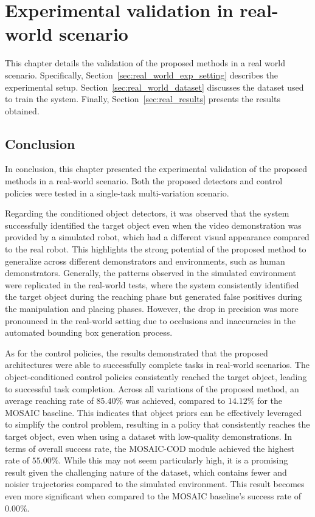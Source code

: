 \chapter{Experimental validation in real-world scenario}
\label{ch:real_world_application}
This chapter details the validation of the proposed methods in a real world scenario. Specifically, Section~\ref{sec:real_world_exp_setting} describes the experimental setup. Section~\ref{sec:real_world_dataset} discusses the dataset used to train the system. Finally, Section~\ref{sec:real_results} presents the results obtained.





\section{Conclusion}
In conclusion, this chapter presented the experimental validation of the proposed methods in a real-world scenario. Both the proposed detectors and control policies were tested in a single-task multi-variation scenario.

Regarding the conditioned object detectors, it was observed that the system successfully identified the target object even when the video demonstration was provided by a simulated robot, which had a different visual appearance compared to the real robot. This highlights the strong potential of the proposed method to generalize across different demonstrators and environments, such as human demonstrators. Generally, the patterns observed in the simulated environment were replicated in the real-world tests, where the system consistently identified the target object during the reaching phase but generated false positives during the manipulation and placing phases. However, the drop in precision was more pronounced in the real-world setting due to occlusions and inaccuracies in the automated bounding box generation process.

As for the control policies, the results demonstrated that the proposed architectures were able to successfully complete tasks in real-world scenarios. The object-conditioned control policies consistently reached the target object, leading to successful task completion. Across all variations of the proposed method, an average reaching rate of $85.40\%$ was achieved, compared to $14.12\%$ for the MOSAIC baseline. This indicates that object priors can be effectively leveraged to simplify the control problem, resulting in a policy that consistently reaches the target object, even when using a dataset with low-quality demonstrations. In terms of overall success rate, the MOSAIC-COD module achieved the highest rate of $55.00\%$. While this may not seem particularly high, it is a promising result given the challenging nature of the dataset, which contains fewer and noisier trajectories compared to the simulated environment. This result becomes even more significant when compared to the MOSAIC baseline's success rate of $0.00\%$.

